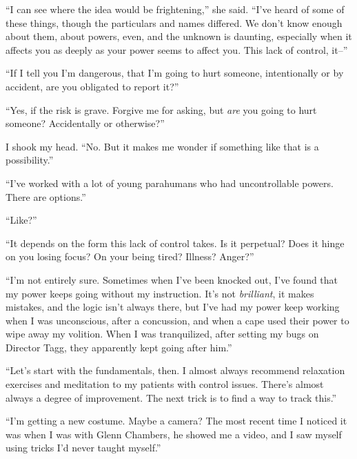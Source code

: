 ``I can see where the idea would be frightening,'' she said.  ``I've heard of some of these things, though the particulars and names differed.  We don't know enough about them, about powers, even, and the unknown is daunting, especially when it affects you as deeply as your power seems to affect you.  This lack of control, it--''



``If I tell you I'm dangerous, that I'm going to hurt someone, intentionally or by accident, are you obligated to report it?''



``Yes, if the risk is grave.  Forgive me for asking, but \emph{are} you going to hurt someone?  Accidentally or otherwise?''



I shook my head.  ``No.  But it makes me wonder if something like that is a possibility.''



``I've worked with a lot of young parahumans who had uncontrollable powers.  There are options.''



``Like?''



``It depends on the form this lack of control takes.  Is it perpetual?  Does it hinge on you losing focus?  On your being tired?  Illness?  Anger?''



``I'm not entirely sure.  Sometimes when I've been knocked out, I've found that my power keeps going without my instruction.  It's not \emph{brilliant}, it makes mistakes, and the logic isn't always there, but I've had my power keep working when I was unconscious, after a concussion, and when a cape used their power to wipe away my volition.  When I was tranquilized, after setting my bugs on Director Tagg, they apparently kept going after him.''



``Let's start with the fundamentals, then.  I almost always recommend relaxation exercises and meditation to my patients with control issues.  There's almost always a degree of improvement.  The next trick is to find a way to track this.''



``I'm getting a new costume.  Maybe a camera?  The most recent time I noticed it was when I was with Glenn Chambers, he showed me a video, and I saw myself using tricks I'd never taught myself.''



